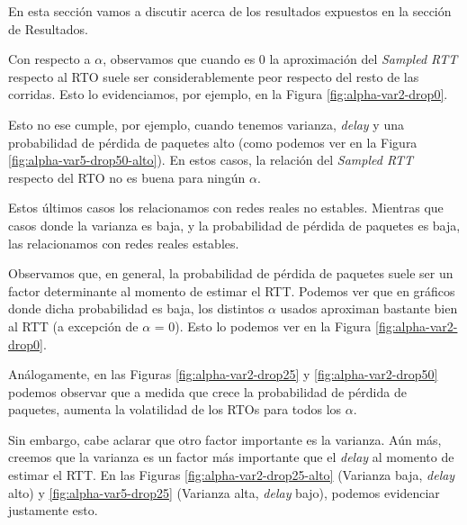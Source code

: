 
En esta sección vamos a discutir acerca de los resultados expuestos en la sección de Resultados.

% 

Con respecto a $\alpha$, observamos que cuando es 0 la aproximación del \emph{Sampled RTT} respecto al RTO suele ser considerablemente peor respecto del resto de las corridas. Esto lo evidenciamos, por ejemplo, en la Figura \ref{fig:alpha-var2-drop0}.

Esto no ese cumple, por ejemplo, cuando tenemos varianza, \emph{delay} y una probabilidad de pérdida de paquetes alto (como podemos ver en la Figura \ref{fig:alpha-var5-drop50-alto}). En estos casos, la relación del \emph{Sampled RTT} respecto del RTO no es buena para ningún $\alpha$. 

Estos últimos casos los relacionamos con redes reales no estables. Mientras que casos donde la varianza es baja, y la probabilidad de pérdida de paquetes es baja, las relacionamos con redes reales estables.

Observamos que, en general, la probabilidad de pérdida de paquetes suele ser un factor determinante al momento de estimar el RTT. Podemos ver que en gráficos donde dicha probabilidad es baja, los distintos $\alpha$ usados aproximan bastante bien al RTT (a excepción de $\alpha$ = 0). Esto lo podemos ver en la Figura \ref{fig:alpha-var2-drop0}.

Análogamente, en las Figuras \ref{fig:alpha-var2-drop25} y \ref{fig:alpha-var2-drop50} podemos observar que a medida que crece la probabilidad de pérdida de paquetes, aumenta la volatilidad de los RTOs para todos los $\alpha$.

Sin embargo, cabe aclarar que otro factor importante es la varianza. Aún más, creemos que la varianza es un factor más importante que el \emph{delay} al momento de estimar el RTT. En las Figuras \ref{fig:alpha-var2-drop25-alto} (Varianza baja, \emph{delay} alto) y \ref{fig:alpha-var5-drop25} (Varianza alta, \emph{delay} bajo), podemos evidenciar justamente esto.

